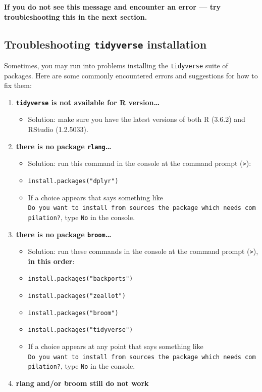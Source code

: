 \documentclass[]{book}
\providecommand{\tightlist}{%
  \setlength{\itemsep}{0pt}\setlength{\parskip}{0pt}}
\begin{document}
\begin{enumerate}
  \textbf{If you do not see this message and encounter an error --- try troubleshooting this in the next section.}
\end{enumerate}

\hypertarget{troubleshooting-tidyverse-installation}{%
\subsection{\texorpdfstring{Troubleshooting \texttt{tidyverse} installation}{Troubleshooting tidyverse installation}}\label{troubleshooting-tidyverse-installation}}

Sometimes, you may run into problems installing the \texttt{tidyverse} suite of packages. Here are some commonly encountered errors and suggestions for how to fix them:

\begin{enumerate}
\def\labelenumi{\arabic{enumi}.}
\tightlist
\item
  \textbf{\texttt{tidyverse} is not available for R version\ldots{}}

  \begin{itemize}
  \tightlist
  \item
    Solution: make sure you have the latest versions of both R (3.6.2) and RStudio (1.2.5033).
  \end{itemize}
\item
  \textbf{there is no package \texttt{rlang}\ldots{}}

  \begin{itemize}
  \tightlist
  \item
    Solution: run this command in the console at the command prompt (\texttt{\textgreater{}}):
  \item
    \texttt{install.packages("dplyr")}
  \item
    If a choice appears that says something like \texttt{Do\ you\ want\ to\ install\ from\ sources\ the\ package\ which\ needs\ compilation?}, type \texttt{No} in the console.
  \end{itemize}
\item
  \textbf{there is no package \texttt{broom}\ldots{}}

  \begin{itemize}
  \tightlist
  \item
    Solution: run these commands in the console at the command prompt (\texttt{\textgreater{}}), \textbf{in this order}:
  \item
    \texttt{install.packages("backports")}
  \item
    \texttt{install.packages("zeallot")}
  \item
    \texttt{install.packages("broom")}
  \item
    \texttt{install.packages("tidyverse")}
  \item
    If a choice appears at any point that says something like \texttt{Do\ you\ want\ to\ install\ from\ sources\ the\ package\ which\ needs\ compilation?}, type \texttt{No} in the console.
  \end{itemize}
\item
  \textbf{rlang and/or broom still do not work}


\end{enumerate}
\end{document}
